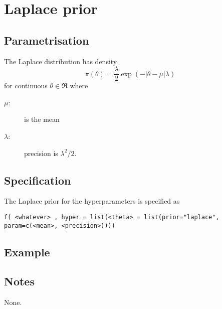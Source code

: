 \documentclass[a4paper,11pt]{article}
\begin{document}
\section*{Laplace prior}

\subsection*{Parametrisation}
The Laplace distribution has density
\begin{equation}
    \pi(\theta)= \frac{\lambda}{2} \exp(-|\theta-\mu| \lambda)
\end{equation}
for continuous $\theta\in\Re$ where
\begin{description}
\item[$\mu$:] is the mean
\item[$\lambda$:] precision is $\lambda^{2}/2$.
\end{description}

\subsection*{Specification}
The Laplace prior for the hyperparameters is specified as
\begin{center}
    \texttt{f( <whatever> , hyper = list(<theta> = list(prior="laplace", param=c(<mean>, <precision>))))}
\end{center}

\subsection*{Example}

\subsection*{Notes}

None.
\end{document}
